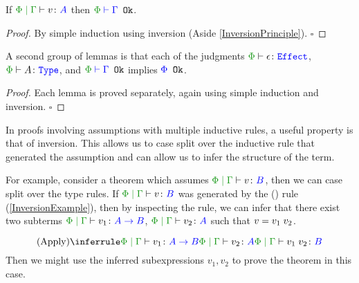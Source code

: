 \begin{framed}
    
    \begin{lemma}
        If $\gpetyperelation{v}{A}$ then $\oke{\P}{\G}$.
    \end{lemma}
    \begin{proof}
        By simple induction using inversion (Aside \ref{InversionPrinciple}). $\square$
    \end{proof}
    
\end{framed}



\begin{framed}
    \begin{lemma}
        A second group of lemmas is that each of the judgments  $\wellformedeffect{\P}{\e}$, $\wellformedtype{\P}{A}$, and $\oke{\P}{\G}$ implies ${\color{blue} \Phi} \texttt{ Ok}$.
    \end{lemma}
    
    \begin{proof}
        Each lemma is proved separately, again using simple induction and inversion. $\square$
    \end{proof}
    
\end{framed}


\begin{framed}
    \begin{aside}\label{InversionPrinciple}
        

        In proofs involving assumptions with multiple inductive rules, a useful property is that of inversion. This allows us to case split over the inductive rule that generated the assumption and can allow us to infer the structure of the term.

        For example, consider a theorem which assumes $\gpetyperelation{v}{B}$, then we can case split over the type rules. If $\gpetyperelation{v}{B}$ was generated by the (\textit{\vapply}) rule (\ref{InversionExample}), then by inspecting the rule, we can infer that there exist two subterms $\gpetyperelation{v_1}{\ab}$, $\gpetyperelation{v_2}{A}$ such that $v = v_1\; v_2$. 

        \begin{equation}\label{InversionExample}
            \ntreeruleII{\vapply}{\gpetyperelation{v_1}{\ab}}{\gpetyperelation{v_2}{A}}{\gpetyperelation{\apply{v_1}{v_2}}{B}}
        \end{equation}
        Then we might use the inferred subexpressions $v_1, v_2$ to prove the theorem in this case.
    \end{aside}
        
    \end{framed}

